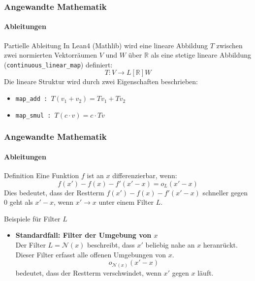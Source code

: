 \documentclass{beamer}
\begin{document}
    \begin{frame}
        \frametitle{Angewandte Mathematik}
        \framesubtitle{Ableitungen}
        \begin{block}{Partielle Ableitung}
            In Lean4 (Mathlib) wird eine lineare Abbildung \( T \) zwischen zwei normierten Vektorräumen \( V \) und \( W \) über \( \mathbb{R} \) als eine stetige lineare Abbildung (\texttt{continuous\_linear\_map}) definiert:
            \[
            T : V \to L[\mathbb{R}] W
            \]
            Die lineare Struktur wird durch zwei Eigenschaften beschrieben:
            \begin{itemize}
                \item \texttt{map\_add : $T (v_1 + v_2) = T v_1 + T v_2$}
                \item \texttt{map\_smul : $T (c \cdot v) = c \cdot T v$}
            \end{itemize}
        \end{block}
    
    \end{frame}





\begin{frame}
    \frametitle{Angewandte Mathematik}
    \framesubtitle{Ableitungen}


\begin{block}{Definition}
  Eine Funktion \( f \) ist an \( x \) differenzierbar, wenn:
  \[
  f(x') - f(x) - f'(x' - x) = o_L(x' - x)
  \]
  Dies bedeutet, dass der Restterm \( f(x') - f(x) - f'(x' - x) \) schneller gegen 0 geht als \( x' - x \), wenn \( x' \to x \) unter einem Filter \( L \).
\end{block}

\begin{block}{Beispiele für Filter \( L \)}
  \begin{itemize}
    \item \textbf{Standardfall: Filter der Umgebung von \( x \)} \\
    Der Filter \( L = \mathcal{N}(x) \) beschreibt, dass \( x' \) beliebig nahe an \( x \) heranrückt. Dieser Filter erfasst alle offenen Umgebungen von \( x \). 
    \[
    o_{\mathcal{N}(x)}(x' - x)
    \]
    bedeutet, dass der Restterm verschwindet, wenn \( x' \) gegen \( x \) läuft.
  \end{itemize}
\end{block}
\end{frame}
\end{document}
